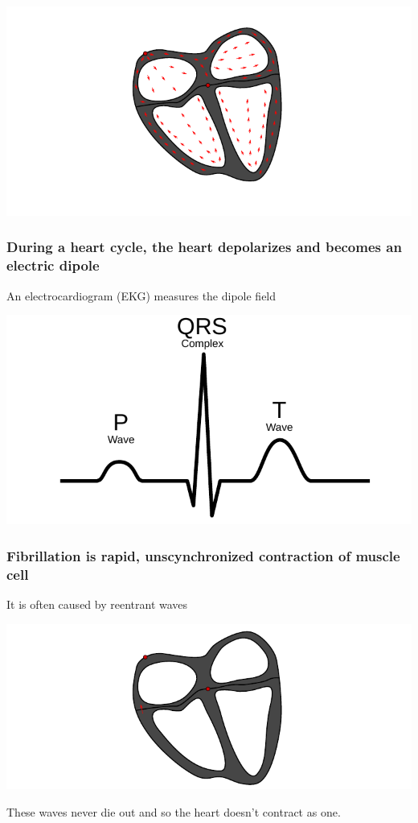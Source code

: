 \documentclass[norsk, 12pt]{beamer}
\begin{document}
\begin{frame}[fragile]
\frametitle{}
\begin{center}
\includegraphics[width=\textwidth]{ecg5}
\end{center}
\end{frame}

\begin{frame}[fragile]
\frametitle{During a heart cycle, the heart depolarizes and becomes an electric dipole}

An electrocardiogram (EKG) measures the dipole field 
\begin{center}
\includegraphics[width=\textwidth]{pqrst}
\end{center}
\end{frame}

\begin{frame}[fragile]
\frametitle{Fibrillation is rapid, unscynchronized contraction of muscle cell}

It is often caused by reentrant waves
\begin{center}
\includegraphics[width=\textwidth]{ecgr}
\end{center}
These waves never die out and so the heart doesn't contract as one.

\end{frame}
\end{document}
